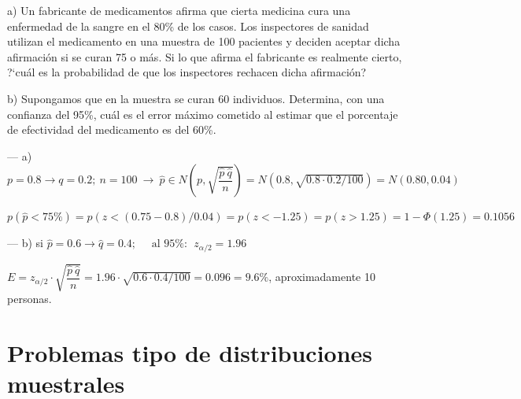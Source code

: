 \vspace{5mm} %
\begin{ejemplo}
\begin{ejer}
	a) Un fabricante de medicamentos afirma que cierta medicina cura una enfermedad de la sangre en el 80\% de los casos. Los inspectores de sanidad utilizan el medicamento en una muestra de 100 pacientes y deciden aceptar dicha afirmación si se curan 75 o más. Si lo que afirma el fabricante es realmente cierto, ?`cuál es la probabilidad de que los inspectores rechacen dicha afirmación?
	
\vspace{2mm} b) Supongamos que en la muestra se curan 60 individuos. Determina, con una confianza del 95\%, cuál es el error máximo cometido al estimar que el porcentaje de efectividad del medicamento es del 60\%.
\end{ejer}
	
\end{ejemplo}

\vspace{2mm} --- a) $p=0.8 \to q=0.2; \ n=100 \ \to \ \widehat p \in N \left( p, \sqrt{\dfrac{\hat p \ \hat q}{n}} \right) = N(0.8,\sqrt{0.8\cdot 0.2/100})=N(0.80,0.04)$

\vspace{2mm} $p(\hat p <75\%)=p(z<(0.75-0.8)/0.04)=p(z<-1.25)=p(z>1.25)=1-\Phi(1.25)=0.1056$

\vspace{2mm} --- b) si $\hat p=0.6 \to \hat q=0.4;\quad \text{ al } 95\%:\ \ z_{\alpha/2}=1.96$

\vspace{2mm} $E=z_{\alpha/2}\cdot \sqrt{\dfrac{\hat p \ \hat q}{n}}=1.96\cdot \sqrt{0.6\cdot 0.4/100}=0.096=9.6\%$, aproximadamente 10 personas.


\section{Problemas tipo de distribuciones muestrales}


